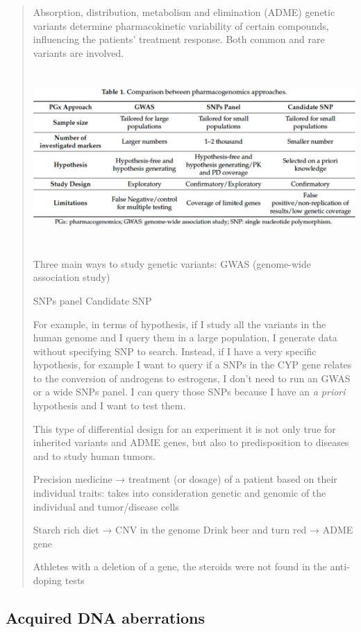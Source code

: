 \begin{quote}
Absorption, distribution, metabolism and elimination (ADME) genetic
variants determine pharmacokinetic variability of certain compounds,
influencing the patients' treatment response. Both common and rare
variants are involved.

\includegraphics[width=6.18852in,height=2.6224in]{image5.jpeg}

Three main ways to study genetic variants: GWAS (genome-wide association
study)

SNPs panel Candidate SNP

For example, in terms of hypothesis, if I study all the variants in the
human genome and I query them in a large population, I generate data
without specifying SNP to search. Instead, if I have a very specific
hypothesis, for example I want to query if a SNPs in the CYP gene
relates to the conversion of androgens to estrogens, I don't need to run
an GWAS or a wide SNPs panel. I can query those SNPs because I have an
\emph{a priori} hypothesis and I want to test them.

This type of differential design for an experiment it is not only true
for inherited variants and ADME genes, but also to predisposition to
diseases and to study human tumors.

Precision medicine → treatment (or dosage) of a patient based on their
individual traits: takes into consideration genetic and genomic of the
individual and tumor/disease cells

Starch rich diet → CNV in the genome Drink beer and turn red → ADME gene

Athletes with a deletion of a gene, the steroids were not found in the
anti-doping tests
\end{quote}

\hypertarget{acquired-dna-aberrations}{%
\subsection{Acquired DNA aberrations}\label{acquired-dna-aberrations}}

